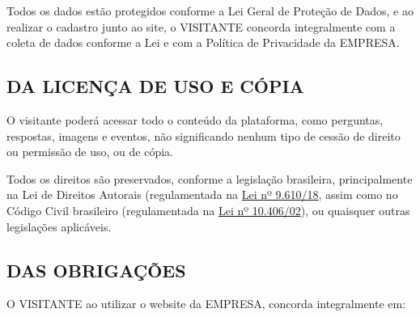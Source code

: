 Todos os dados estão protegidos conforme a Lei Geral de Proteção de Dados, e ao realizar o cadastro junto ao site, o VISITANTE concorda integralmente com a coleta de dados conforme a Lei e com a Política de Privacidade da EMPRESA.
 
\subsection{DA LICENÇA DE USO E CÓPIA}
 
O visitante poderá acessar todo o conteúdo da plataforma, como perguntas, respostas, imagens e eventos, não significando nenhum tipo de cessão de direito ou permissão de uso, ou de cópia.
 
Todos os direitos são preservados, conforme a legislação brasileira, principalmente na Lei de Direitos Autorais (regulamentada na \href{http://www.planalto.gov.br/ccivil_03/leis/l9610.htm}{Lei nº 9.610/18}, assim como no Código Civil brasileiro (regulamentada na \href{http://www.planalto.gov.br/ccivil_03/leis/l9610.htm}{Lei nº 10.406/02}), ou quaisquer outras legislações aplicáveis.
 
\subsection{DAS OBRIGAÇÕES}
 
O VISITANTE ao utilizar o website da EMPRESA, concorda integralmente em:

